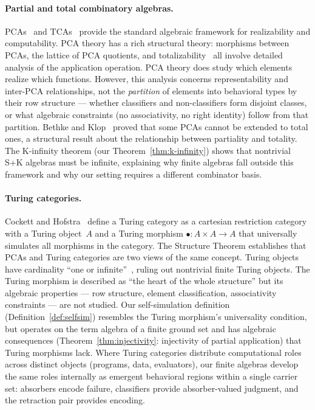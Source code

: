 \documentclass[sigconf,screen]{acmart}
\theoremstyle{remark}
\begin{document}
\paragraph{Partial and total combinatory algebras.}
PCAs~\cite{vanoosten08,longley15} and TCAs~\cite{bethke88} provide the standard algebraic framework for realizability and computability. PCA theory has a rich structural theory: morphisms between PCAs, the lattice of PCA quotients, and totalizability~\cite{bethke96} all involve detailed analysis of the application operation. PCA theory does study which elements realize which functions. However, this analysis concerns representability and inter-PCA relationships, not the \emph{partition} of elements into behavioral types by their row structure --- whether classifiers and non-classifiers form disjoint classes, or what algebraic constraints (no associativity, no right identity) follow from that partition. Bethke and Klop~\cite{bethke96} proved that some PCAs cannot be extended to total ones, a structural result about the relationship between partiality and totality. The K-infinity theorem (our Theorem~\ref{thm:k-infinity}) shows that nontrivial S+K algebras must be infinite, explaining why finite algebras fall outside this framework and why our setting requires a different combinator basis.

\paragraph{Turing categories.}
Cockett and Hofstra~\cite{cockett08} define a Turing category as a cartesian restriction category with a Turing object~$A$ and a Turing morphism $\bullet : A \times A \to A$ that universally simulates all morphisms in the category. The Structure Theorem establishes that PCAs and Turing categories are two views of the same concept. Turing objects have cardinality ``one or infinite''~\cite{cockett08}, ruling out nontrivial finite Turing objects. The Turing morphism is described as ``the heart of the whole structure'' but its algebraic properties --- row structure, element classification, associativity constraints --- are not studied. Our self-simulation definition (Definition~\ref{def:selfsim}) resembles the Turing morphism's universality condition, but operates on the term algebra of a finite ground set and has algebraic consequences (Theorem~\ref{thm:injectivity}: injectivity of partial application) that Turing morphisms lack. Where Turing categories distribute computational roles across distinct objects (programs, data, evaluators), our finite algebras develop the same roles internally as emergent behavioral regions within a single carrier set: absorbers encode failure, classifiers provide absorber-valued judgment, and the retraction pair provides encoding.
\end{document}
